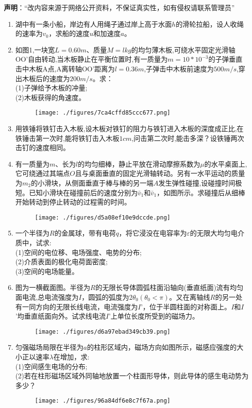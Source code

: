 
\textbf{声明}：“改内容来源于网络公开资料，不保证真实性，如有侵权请联系管理员”


\begin{enumerate}
\item 湖中有一条小船，岸边有人用绳子通过岸上高于水面$h$的滑轮拉船，设人收绳的速率为$v_0$，求船的速度$u$和加速度$a$。
\item 如图1,一块宽$L=0.60m$、质量$M=lkg$的均匀薄木板,可绕水平固定光滑轴OO'自由转动,当木板静止在平衡位置时,有一质量为$m=10*10^{-3}$的子弹垂直击中木板A点,A离转轴OO'距离为$l=0.36m$,子弹击中木板前速度为$500m/s$,穿出木板后的速度为$200m/s$。求：\\
(1)子弹给予木板的冲量;\\
(2)木板获得的角速度。
\begin{figure}[ht]
\centering
\texttt{[image: ./figures/7ca4cffd85ccc677.png]}
\caption{} \label{fig_SSD14_1}
\end{figure}
\item 用铁锤将铁钉击入木板,设木板对铁钉的阻力与铁钉进入木板的深度成正比,在铁锤击第一次时,能将铁钉击入木板$1cm$,问击第二次时,能击多深？设铁锤两次击钉的速度相同。
\item 有一质量为$m$、长为$l$的均匀细棒，静止平放在滑动摩擦系数为$\mu$的水平桌面上,它可绕通过其端点$O$且与桌面垂直的固定光滑轴转动。另有一水平运动的质量为$m_2$的小滑块，从侧面垂直于棒与棒的另一端$A$发生弹性碰撞,设碰撞时间极短。已知小滑块在碰撞前后的速度分别为$\bar v_1$和$\bar v_1$，如图所示。求碰撞后从细棒开始转动到停止转动的过程需的时间。
\begin{figure}[ht]
\centering
\texttt{[image: ./figures/d5a08ef10e9dccde.png]}
\caption{} \label{fig_SSD14_2}
\end{figure}
\item 一个半径为$R$的金属球，带有电荷$q$，将它浸没在电容率为$\varepsilon$的无限大均匀电介质中，试求:\\
(1)空间的电位移、电场强度、电势的分布;\\
(2)介质表面的极化电荷面密度;\\
(3)空间的电场能量。
\item 图为一横截面图。半径为$R$的无限长导体圆弧柱面沿轴向(垂直纸面)流有均匀面电流,总电流强度为$I$，圆弧的弧度为$2\theta_0(\theta_0<\pi)$。又在离轴线$R$的另一处有一同方向的无限长线电流，电流强度为$I$’，位于半圆柱面的对称面上。$I$和$I$’均垂直纸面向外。试求线电流$I$’上单位长度所受到的磁场力。
\begin{figure}[ht]
\centering
\texttt{[image: ./figures/d6a97ebad349cb39.png]}
\caption{} \label{fig_SSD14_4}
\end{figure}
\item 匀强磁场局限在半径为$a$的柱形区域内，磁场方向如图所示，磁感应强度的大小正以速率$\lambda$在增加，求:\\
(1)空间感生电场的分布;\\
(2)若在柱形磁场区域外同轴地放置一个柱面形导体，则此导体的感生电动势为多少？
\begin{figure}[ht]
\centering
\texttt{[image: ./figures/96a84df6e8c7f67a.png]}
\caption{} \label{fig_SSD14_5}
\end{figure}
\end{enumerate}